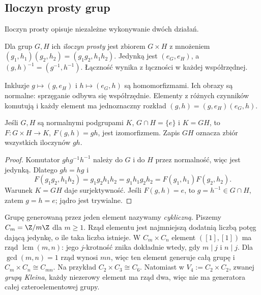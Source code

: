 \subsection*{Iloczyn prosty grup}
\label{subsec:iloczyn-prosty}

Iloczyn prosty opisuje niezależne wykonywanie dwóch działań.
\begin{definicja}
Dla grup $G,H$ ich \emph{iloczyn prosty} jest zbiorem $G\times H$
z mnożeniem $(g_1,h_1)(g_2,h_2)=(g_1g_2,h_1h_2)$.
Jedynką jest $(e_G,e_H)$, a $(g,h)^{-1}=(g^{-1},h^{-1})$.
Łączność wynika z łączności w każdej współrzędnej.
\end{definicja}

Inkluzje $g\mapsto(g,e_H)$ i $h\mapsto(e_G,h)$ są homomorfizmami.
Ich obrazy są normalne: sprzęganie odbywa się współrzędnie.
Elementy z różnych czynników komutują i każdy element ma jednoznaczny
rozkład $(g,h)=(g,e_H)(e_G,h)$.

\begin{stwierdzenie}
Jeśli $G,H$ są normalnymi podgrupami $K$, $G\cap H=\{e\}$ i $K=GH$,
to $F:G\times H\to K$, $F(g,h)=gh$, jest izomorfizmem.
Zapis $GH$ oznacza zbiór wszystkich iloczynów $gh$.
\end{stwierdzenie}
\begin{proof}
Komutator $ghg^{-1}h^{-1}$ należy do $G$ i do $H$ przez normalność,
więc jest jedynką. Dlatego $gh=hg$ i
\[
 F(g_1g_2,h_1h_2)=g_1g_2h_1h_2=g_1h_1g_2h_2
 =F(g_1,h_1)F(g_2,h_2).
\]
Warunek $K=GH$ daje surjektywność. Jeśli $F(g,h)=e$, to
$g=h^{-1}\in G\cap H$, zatem $g=h=e$; jądro jest trywialne.
\end{proof}

\begin{przyklad}
Grupę generowaną przez jeden element nazywamy \emph{cykliczną}.
Piszemy $C_m=\Z/m\Z$ dla $m\geq1$. Rząd elementu jest najmniejszą
dodatnią liczbą potęg dającą jedynkę, o ile taka liczba istnieje.
W $C_m\times C_n$ element $([1],[1])$ ma rząd
$\operatorname{lcm}(m,n)$: jego $j$-krotność znika dokładnie wtedy,
gdy $m\mid j$ i $n\mid j$. Dla $\gcd(m,n)=1$ rząd wynosi $mn$,
więc ten element generuje całą grupę i $C_m\times C_n\cong C_{mn}$.
Na przykład $C_2\times C_3\cong C_6$. Natomiast w
$V_4:=C_2\times C_2$, zwanej \emph{grupą Kleina}, każdy niezerowy
element ma rząd dwa, więc nie ma generatora całej czteroelementowej grupy.
\end{przyklad}

